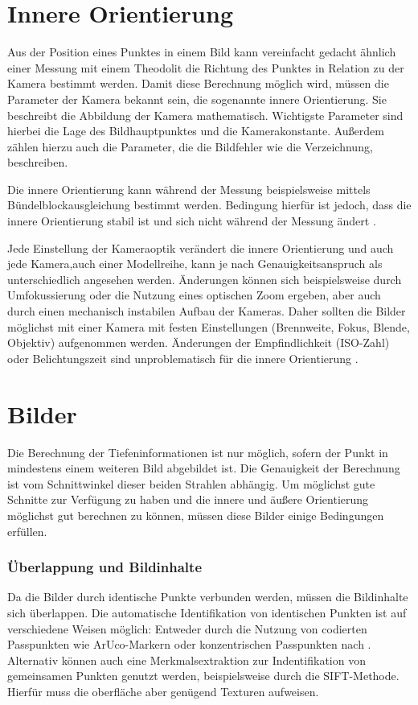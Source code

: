 \documentclass[./00PhotoBox.tex]{subfiles}
\begin{document}
\section{Innere Orientierung}
\label{s:innereorientierung}
Aus der Position eines Punktes in einem Bild kann vereinfacht gedacht ähnlich einer Messung mit einem Theodolit die Richtung des Punktes in Relation zu der Kamera bestimmt werden. Damit diese Berechnung möglich wird, müssen die Parameter der Kamera bekannt sein, die sogenannte innere Orientierung. Sie beschreibt die Abbildung der Kamera mathematisch. Wichtigste Parameter sind hierbei die Lage des Bildhauptpunktes und die Kamerakonstante. Außerdem zählen hierzu auch die Parameter, die die Bildfehler wie die Verzeichnung, beschreiben. \citep[S. 179f]{luhmann}

Die innere Orientierung kann während der Messung beispielsweise mittels Bündel\-block\-ausgleichung bestimmt werden. Bedingung hierfür ist jedoch, dass die innere Orientierung stabil ist und sich nicht während der Messung ändert \citep[S. 181f]{luhmann}.

Jede Einstellung der Kameraoptik verändert die innere Orientierung und auch jede Kamera,auch einer Modellreihe, kann je nach Genauigkeitsanspruch als unterschiedlich angesehen werden. Änderungen können sich beispielsweise durch Umfokussierung oder die Nutzung eines optischen Zoom ergeben, aber auch durch einen mechanisch instabilen Aufbau der Kameras. Daher sollten die Bilder möglichst mit einer Kamera mit festen Einstellungen (Brennweite, Fokus, Blende, Objektiv) aufgenommen werden. Änderungen der Empfindlichkeit (ISO-Zahl) oder Belichtungszeit sind unproblematisch für die innere Orientierung \citep[S. 176]{luhmann}.


\section{Bilder}
\label{s:bilder}

Die Berechnung der Tiefeninformationen ist nur möglich, sofern der Punkt in mindestens einem weiteren Bild abgebildet ist. Die Genauigkeit der Berechnung ist vom Schnittwinkel dieser beiden Strahlen abhängig. Um möglichst gute Schnitte zur Ver\-fügung zu haben und die innere und äußere Orientierung möglichst gut berechnen zu können, müssen diese Bilder einige Bedingungen erfüllen.

\subsubsection{Überlappung und Bildinhalte}
Da die Bilder durch identische Punkte verbunden werden, müssen die Bildinhalte sich überlappen. Die automatische Identifikation von identischen Punkten ist auf verschiedene Weisen möglich: Entweder durch die Nutzung von codierten Passpunkten wie ArUco-Markern oder konzentrischen Passpunkten nach \cite{schneider}. Alternativ können auch eine Merkmalsextraktion zur Indentifikation von gemeinsamen Punkten genutzt werden, beispielsweise durch die SIFT-Methode. Hierfür muss die oberfläche aber genügend Texturen aufweisen. \citep[S. 478]{luhmann}
\end{document}
